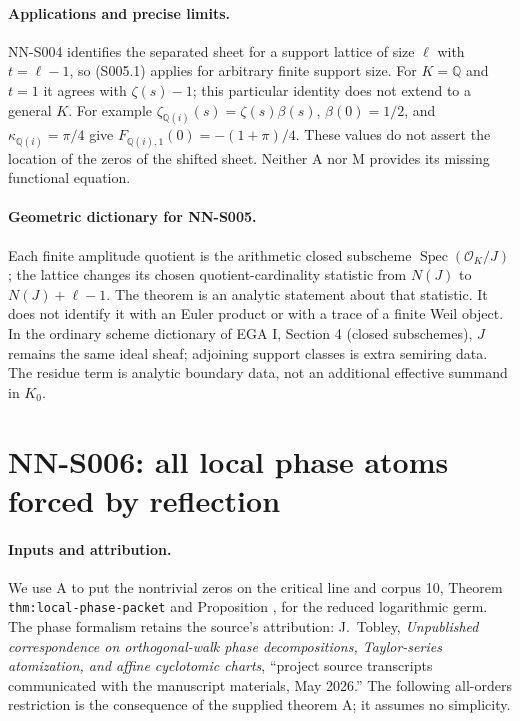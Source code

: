 \paragraph{Applications and precise limits.}
NN-S004 identifies the separated sheet for a support lattice of
size $\ell$ with $t=\ell-1$, so (S005.1) applies for arbitrary
finite support size. For $K=\mathbb Q$ and $t=1$ it agrees with
$\zeta(s)-1$; this particular identity does not extend to a
general $K$. For example $\zeta_{\mathbb Q(i)}(s)=\zeta(s)\beta(s)$,
$\beta(0)=1/2$, and $\kappa_{\mathbb Q(i)}=\pi/4$ give
$F_{\mathbb Q(i),1}(0)=-(1+\pi)/4$. These values do not assert
the location of the zeros of the shifted sheet. Neither A nor M
provides its missing functional equation.

\paragraph{Geometric dictionary for NN-S005.}
Each finite amplitude quotient is the arithmetic closed
subscheme $\operatorname{Spec}(\mathcal O_K/J)$; the lattice
changes its chosen quotient-cardinality statistic from $N(J)$ to
$N(J)+\ell-1$. The theorem is an analytic statement about that
statistic. It does not identify it with an Euler product or with
a trace of a finite Weil object. In the ordinary scheme dictionary
of EGA I, Section 4 (closed subschemes), $J$ remains the same
ideal sheaf; adjoining support classes is extra semiring data.
The residue term is analytic boundary data, not an additional
effective summand in $K_0$.



\section{NN-S006: all local phase atoms forced by reflection}
\label{sec:NN-S006}

\paragraph{Inputs and attribution.}
We use A to put the nontrivial zeros on the critical line and
corpus 10, Theorem \texttt{thm:local-phase-packet} and Proposition
, for the reduced logarithmic
germ. The phase formalism retains the source's attribution:
J.~Tobley, \emph{Unpublished correspondence on orthogonal-walk
phase decompositions, Taylor-series atomization, and affine
cyclotomic charts}, ``project source transcripts communicated with
the manuscript materials, May 2026.'' The following
all-orders restriction is the consequence of the supplied theorem
A; it assumes no simplicity.

